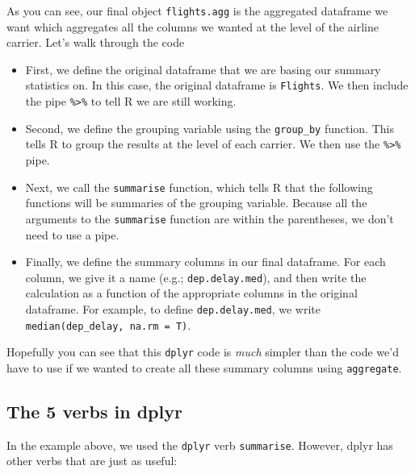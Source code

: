 \documentclass{tufte-book}\usepackage[]{graphicx}\usepackage[]{color}
\begin{document}
\begin{footnotesize}
As you can see, our final object \texttt{flights.agg} is the aggregated dataframe we want which aggregates all the columns we wanted at the level of the airline carrier. Let's walk through the code


\begin{itemize}
  \item First, we define the original dataframe that we are basing our summary statistics on. In this case, the original dataframe is \texttt{Flights}. We then include the pipe \texttt{\%>\%} to tell R we are still working.
  \item Second, we define the grouping variable using the \texttt{group\_by} function. This tells R to group the results at the level of each carrier. We then use the \texttt{\%>\%} pipe.
  \item Next, we call the \texttt{summarise} function, which tells R that the following functions will be summaries of the grouping variable. Because all the arguments to the \texttt{summarise} function are within the parentheses, we don't need to use a pipe.
  \item Finally, we define the summary columns in our final dataframe. For each column, we give it a name (e.g.; \texttt{dep.delay.med}), and then write the calculation as a function of the appropriate columns in the original dataframe. For example, to define \texttt{dep.delay.med}, we write \texttt{median(dep\_delay, na.rm = T)}.
  
\end{itemize}

Hopefully you can see that this \texttt{dplyr} code is \textit{much} simpler than the code we'd have to use if we wanted to create all these summary columns using \texttt{aggregate}.

\subsection{The 5 verbs in dplyr}

In the example above, we used the \texttt{dplyr} verb \texttt{summarise}. However, dplyr has other verbs that are just as useful:


\end{footnotesize}
\end{document}
